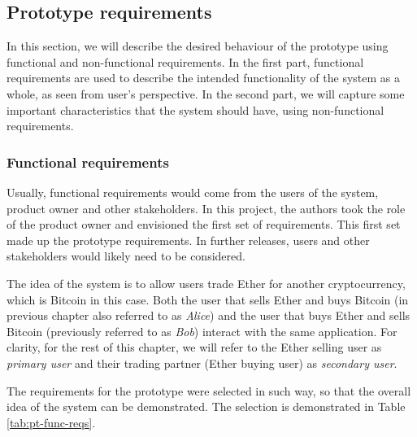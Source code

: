 \subsection{Prototype requirements}

In this section, we will describe the desired behaviour of the prototype using functional and non-functional requirements. In the first part, functional requirements are used to describe the intended functionality of the system as a whole, as seen from user's perspective. In the second part, we will capture some important characteristics that the system should have, using non-functional requirements.

\subsubsection{Functional requirements}
Usually, functional requirements would come from the users of the system, product owner and other stakeholders. In this project, the authors took the role of the product owner and envisioned the first set of requirements. This first set made up the prototype requirements. In further releases, users and other stakeholders would likely need to be considered.


The idea of the system is to allow users trade Ether for another cryptocurrency, which is Bitcoin in this case. Both the user that sells Ether and buys Bitcoin (in previous chapter also referred to as \textit{Alice}) and the user that buys Ether and sells Bitcoin (previously referred to as \textit{Bob}) interact with the same application. For clarity, for the rest of this chapter, we will refer to the Ether selling user as \textit{primary user} and their trading partner (Ether buying user) as \textit{secondary user}.

The requirements for the prototype were selected in such way, so that the overall idea of the system can be demonstrated. The selection is demonstrated in Table \ref{tab:pt-func-reqs}. 

